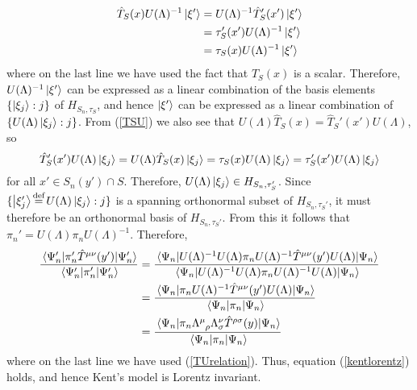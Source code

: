 \begin{equation}\label{TSUxi}
\begin{split}
\hat{T}_S(x)U(\Lambda)^{-1}\ket{\xi'}&= U(\Lambda)^{-1} \hat{T}_S'(x')\ket{\xi'}\\
&=\tau_S'(x')U(\Lambda)^{-1}\ket{\xi'}\\
&=\tau_S(x)U(\Lambda)^{-1}\ket{\xi'}
\end{split}
\end{equation}
where on the last line we have used the fact that $T_S(x)$ is a scalar. Therefore, $U(\Lambda)^{-1}\ket{\xi'}$ can be expressed as a linear combination of the basis elements $\{\ket{\xi_j}:j\}$ of $H_{S_n,\tau_S}$, and hence  $\ket{\xi'}$  can be expressed as a linear combination of $\{U(\Lambda)\ket{\xi_j}:j\}$. From (\ref{TSU}) we also see that  $U(\Lambda)\hat{T}_S(x)=\hat{T}_S'(x')U(\Lambda)$, so
$$
\hat{T}_S'(x')U(\Lambda)\ket{\xi_j}=U(\Lambda)\hat{T}_S(x)\ket{\xi_j}=\tau_S(x)U(\Lambda)\ket{\xi_j}=\tau_S'(x')U(\Lambda)\ket{\xi_j}
$$
for all $x'\in S_n(y')\cap S$. Therefore, $U(\Lambda)\ket{\xi_j}\in H_{S_n,\tau_S'}$.
Since $\{\ket{\xi_j'}\myeq U(\Lambda)\ket{\xi_j}:j\}$ is a spanning orthonormal subset of $H_{S_n,\tau_S'}$, it must therefore be an orthonormal basis of $H_{S_n,\tau_S'}$. From this it follows that $\pi_n'=U(\Lambda)\pi_nU(\Lambda)^{-1}$. Therefore, 
\begin{equation}\label{kentlorentz2}
\begin{split}
\frac{\ev{\pi_n'\hat{T}^{\mu\nu}(y')}{\Psi_n'}}{\ev{\pi_n'}{\Psi_n'}}&=\frac{\ev{U(\Lambda)^{-1}U(\Lambda)\pi_nU(\Lambda)^{-1}\hat{T}^{\mu\nu}(y')U(\Lambda)}{\Psi_n}}{\ev{U(\Lambda)^{-1}U(\Lambda)\pi_n U(\Lambda)^{-1}U(\Lambda)}{\Psi_n}}\\
&=\frac{\ev{\pi_nU(\Lambda)^{-1}\hat{T}^{\mu\nu}(y')U(\Lambda)}{\Psi_n}}{\ev{\pi_n}{\Psi_n}}\\
&=\frac{\ev{\pi_n\Lambda\indices{^\mu_\rho}\Lambda{^\nu_\sigma}\hat{T}^{\rho\sigma}(y)}{\Psi_n}}{\ev{\pi_n }{\Psi_n}}
\end{split}
\end{equation}
where on the last line we have used (\ref{TUrelation}). Thus, equation (\ref{kentlorentz}) holds, and hence Kent's model is Lorentz invariant.

